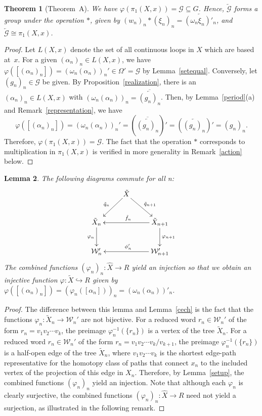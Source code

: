\documentclass{amsart}
\newtheorem{theorem}{Theorem}[section]
\newtheorem{lemma}[theorem]{Lemma}
\theoremstyle{definition}
\theoremstyle{remark}
\numberwithin{equation}{section}
\begin{document}
\begin{theorem}[Theorem~A]\label{group}
 We have $\varphi(\pi_1(X,x))={\mathcal G}\subseteq G$. Hence,  $\overleftarrow{\mathcal G}$ forms a group under the operation $\ast$, given by $(w_n)_n \ast (\xi_n)_n=\overleftarrow{(\omega_n\xi_n)'_n}$, and  $\overleftarrow{\mathcal G}\cong\pi_1(X,x)$.
\end{theorem}

\begin{proof}
Let $L(X,x)$ denote the set of all continuous loops in $X$ which are based at~$x$. For a given $(\alpha_n)_n\in L(X,x)$, we have $\varphi([(\alpha_n)_n])=(\omega_n(\alpha_n))_n'\in \Omega'={\mathcal G}$ by Lemma~\ref{setequal}.
Conversely, let $(g_n)_n\in {\mathcal G}$ be given.
By Proposition~\ref{realization}, there is an $(\alpha_n)_n\in L(X,x)$ with $(\omega_n(\alpha_n))_n=\overline{\overleftarrow{(g_n)_n}}$. Then, by Lemma~\ref{period}(a) and Remark~\ref{representation}, we have \[\varphi([(\alpha_n)_n])=(\omega_n(\alpha_n))_n'=
\left(\overline{\overleftarrow{(g_n)_n}}\right)'=\left(\overleftarrow{(g_n)_n}\right)'=(g_n)_n.\]
Therefore, $\varphi(\pi_1(X,x))={\mathcal G}$. The fact that the operation $\ast$ corresponds to multiplication in $\pi_1(X,x)$ is verified in more generality in Remark~\ref{action} below.

\end{proof}

\begin{lemma}\label{phi}
The following diagrams commute for all n:
\[ \xymatrix{& \tilde{X}\ar[ld]_{\tilde{q}_n} \ar[rd]^{\tilde{q}_{n+1}} & \\ \tilde{X}_n \ar[d]_{\varphi_n}& &\tilde{X}_{n+1} \ar[ll]_{\tilde{f}_n} \ar[d]^{\varphi_{n+1} }\\
{\mathcal W}_n' & & {\mathcal W}_{n+1}'\ar[ll]_{\phi'_n } }\]
The combined functions $\displaystyle (\varphi_n)_n:\hat{X}\rightarrow  R$
    yield an injection so that we obtain an injective function  $\varphi:\tilde{X}\hookrightarrow  R$ given by $\varphi([(\alpha_n)_n])=(\varphi_n([\alpha_n]))_n=(\omega_n(\alpha_n))'_n$.
\end{lemma}

\begin{proof}
The difference between this lemma and Lemma~\ref{cech} is the fact that the functions $\varphi_n:\tilde{X}_n\rightarrow {\mathcal W}_n'$ are not bijective.  For a reduced word $r_n\in{\mathcal W}_n'$ of the form $r_n=v_1v_2\cdots v_k$, the preimage $\varphi_n^{-1}(\{r_n\})$ is a vertex of the tree $\tilde{X}_n$. For  a reduced word  $r_n\in{\mathcal W}_n'$ of the form  $r_n=v_1v_2\cdots v_k/v_{k+1}$, the preimage $\varphi_n^{-1}(\{r_n\})$  is a half-open edge of the tree $\tilde{X}_n$, where $v_1v_2\cdots v_k$ is the shortest edge-path representative for the homotopy class of paths that connect $x_n$ to the included vertex of the projection of this edge in $X_n$. Therefore, by Lemma~\ref{setup}, the combined functions  $(\varphi_n)_n$ yield an  injection. Note that although each $\varphi_n$ is clearly surjective, the combined functions $\displaystyle (\varphi_n)_n:\hat{X}\rightarrow  R$ need not yield a surjection, as illustrated in the following remark.
\end{proof}
\end{document}
